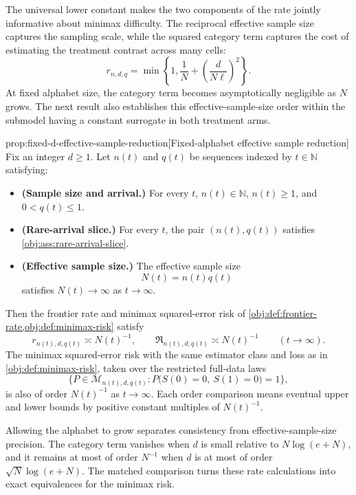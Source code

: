 \documentclass[11pt]{article}
\begin{document}
The universal lower constant  makes the two components of the rate jointly informative about minimax difficulty. The reciprocal effective sample size captures the sampling scale, while the squared category term captures the cost of estimating the treatment contrast across many cells:
\[
r_{n,d,q}
=
\min\left\{1,\frac1N+\left(\frac{d}{N\ell}\right)^2\right\}.
\]
At fixed alphabet size, the category term becomes asymptotically negligible as \(N\) grows. The next result also establishes this effective-sample-size order within the submodel having a constant surrogate in both treatment arms.

\begin{propositionv}{prop:fixed-d-effective-sample-reduction}[Fixed-alphabet effective sample reduction]
Fix an integer \(d\ge 1\). Let \(n(t)\) and \(q(t)\) be sequences indexed by \(t\in\mathbb N\) satisfying:
\begin{itemize}
\item \textbf{(Sample size and arrival.)} For every \(t\), \(n(t)\in\mathbb N\), \(n(t)\ge 1\), and \(0<q(t)\le 1\).
\item \textbf{(Rare-arrival slice.)} For every \(t\), the pair \((n(t),q(t))\) satisfies \cref{obj:ass:rare-arrival-slice}.
\item \textbf{(Effective sample size.)} The effective sample size
\[
N(t)=n(t)q(t)
\]
satisfies \(N(t)\to\infty\) as \(t\to\infty\).
\end{itemize}
Then the frontier rate and minimax squared-error risk of \cref{obj:def:frontier-rate,obj:def:minimax-risk} satisfy
\[
r_{n(t),d,q(t)}\asymp N(t)^{-1},
\qquad
\mathfrak R_{n(t),d,q(t)}\asymp N(t)^{-1}
\qquad (t\to\infty).
\]
The minimax squared-error risk with the same estimator class and loss as in \cref{obj:def:minimax-risk}, taken over the restricted full-data laws
\[
\bigl\{P\in\mathcal M_{n(t),d,q(t)}:
P\bigl(S(0)=0,\ S(1)=0\bigr)=1\bigr\},
\]
is also of order \(N(t)^{-1}\) as \(t\to\infty\). Each order comparison means eventual upper and lower bounds by positive constant multiples of \(N(t)^{-1}\).
\end{propositionv}

Allowing the alphabet to grow separates consistency from effective-sample-size precision. The category term vanishes when \(d\) is small relative to \(N\log(e+N)\), and it remains at most of order \(N^{-1}\) when \(d\) is at most of order \(\sqrt N\log(e+N)\). The matched comparison turns these rate calculations into exact equivalences for the minimax risk.
\end{document}
